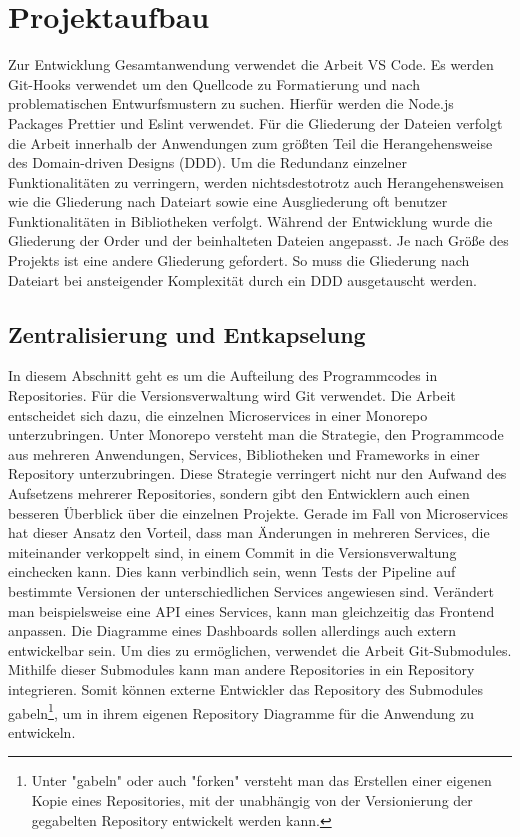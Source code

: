 \section{Projektaufbau}
\label{sec:projektaufbau}
Zur Entwicklung Gesamtanwendung verwendet die Arbeit VS Code. Es werden Git-Hooks
verwendet um den Quellcode zu Formatierung und nach problematischen Entwurfsmustern
zu suchen. Hierfür werden die Node.js Packages Prettier und Eslint verwendet.
Für die Gliederung der Dateien verfolgt die Arbeit innerhalb der Anwendungen zum größten Teil die Herangehensweise des
Domain-driven Designs (DDD). Um die Redundanz einzelner Funktionalitäten zu verringern, werden nichtsdestotrotz auch Herangehensweisen
wie die Gliederung nach Dateiart sowie eine Ausgliederung oft benutzer Funktionalitäten in Bibliotheken verfolgt. Während der Entwicklung
wurde die Gliederung der Order und der beinhalteten Dateien angepasst. Je nach Größe des Projekts ist eine andere Gliederung gefordert.
So muss die Gliederung nach Dateiart bei ansteigender Komplexität durch ein DDD ausgetauscht werden.

\subsection{Zentralisierung und Entkapselung}
\label{subsec:zentralisierungundentkapselung}
In diesem Abschnitt geht es um die Aufteilung des
Programmcodes in Repositories. Für die Versionsverwaltung
wird Git verwendet. Die Arbeit entscheidet sich dazu,
die einzelnen Microservices in einer Monorepo unterzubringen.
Unter Monorepo versteht man die Strategie, den Programmcode
aus mehreren Anwendungen, Services, Bibliotheken und Frameworks
in einer Repository unterzubringen.\cite{MonorepoTrunkBasedDevelopment}
Diese Strategie verringert nicht nur den Aufwand
des Aufsetzens mehrerer Repositories, sondern gibt den
Entwicklern auch einen besseren Überblick über die einzelnen
Projekte. Gerade im Fall von Microservices hat dieser
Ansatz den Vorteil, dass man Änderungen in mehreren Services,
die miteinander verkoppelt sind, in einem Commit in die
Versionsverwaltung einchecken kann. Dies kann verbindlich sein,
wenn Tests der Pipeline auf bestimmte Versionen der unterschiedlichen
Services angewiesen sind. Verändert man beispielsweise
eine API eines Services, kann man gleichzeitig das Frontend
anpassen. Die Diagramme eines Dashboards sollen allerdings
auch extern entwickelbar sein. Um dies zu ermöglichen, verwendet
die Arbeit Git-Submodules.\cite{GitsubmodulesGitSCM} Mithilfe dieser Submodules
kann man andere Repositories in ein Repository integrieren. Somit können externe Entwickler das Repository des
Submodules gabeln\footnote{Unter "gabeln" oder auch "forken" versteht man
das Erstellen einer eigenen Kopie eines Repositories, mit der unabhängig von
der Versionierung der gegabelten Repository entwickelt werden kann.},
um in ihrem eigenen Repository Diagramme für die Anwendung zu entwickeln.

